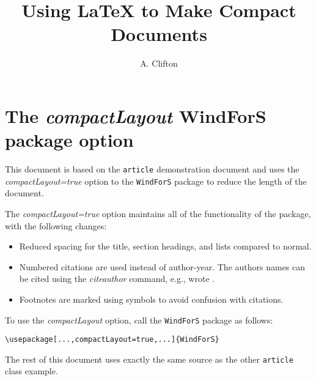 \documentclass[twocolumn,a4paper]{article}
\title{Using LaTeX to Make Compact Documents}
\author{A. Clifton}
\begin{document}
\lstset{language=[LaTeX]Tex,columns=fullflexible,keepspaces=true,breaklines=true}

\section*{The \emph{compactLayout} WindForS package option}

This document is based on the \texttt{article} demonstration document and uses the \emph{compactLayout=true} option to the \texttt{WindForS} package to reduce the length of the document.

The \emph{compactLayout=true} option maintains all of the functionality of the package, with the following changes:
\begin{itemize}
\item Reduced spacing for the title, section headings, and lists compared to normal.
\item Numbered citations are used \citep[e.g.,][]{TechReportTest} instead of author-year. The authors names can be cited using the \emph{citeauthor} command, e.g., \citeauthor{TechReportTest} wrote \cite{TechReportTest}.
\item Footnotes are marked using symbols to avoid confusion with citations.  
\end{itemize}

To use the \emph{compactLayout} option, call the \texttt{WindForS} package as follows:

\begin{lstlisting}
\usepackage[...,compactLayout=true,...]{WindForS}
\end{lstlisting}

The rest of this document uses exactly the same source as the other \texttt{article} class example.

\clearpage

\maketitle



\tableofcontents
\listoffigures
\listoftables






\label{sec:TheBibliography}
\printbibliography

\appendix


\end{document}

